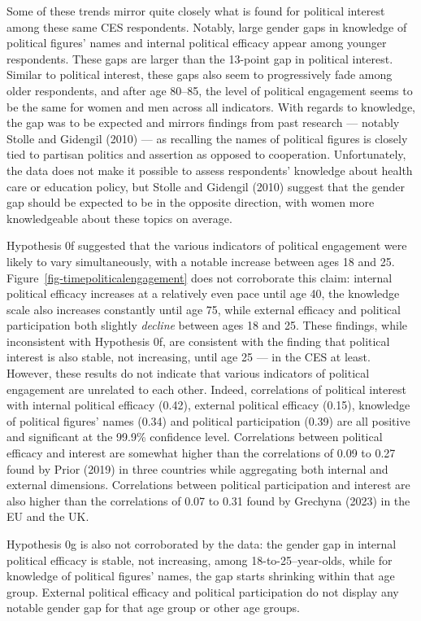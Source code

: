 \documentclass[
  letterpaper,
  DIV=11,
  numbers=noendperiod]{scrreprt}
\begin{document}
Some of these trends mirror quite closely what is found for political
interest among these same CES respondents. Notably, large gender gaps in
knowledge of political figures' names and internal political efficacy
appear among younger respondents. These gaps are larger than the
13-point gap in political interest. Similar to political interest, these
gaps also seem to progressively fade among older respondents, and after
age 80--85, the level of political engagement seems to be the same for
women and men across all indicators. With regards to knowledge, the gap
was to be expected and mirrors findings from past research --- notably
Stolle and Gidengil (2010) --- as recalling the names of political
figures is closely tied to partisan politics and assertion as opposed to
cooperation. Unfortunately, the data does not make it possible to assess
respondents' knowledge about health care or education policy, but Stolle
and Gidengil (2010) suggest that the gender gap should be expected to be
in the opposite direction, with women more knowledgeable about these
topics on average.

Hypothesis 0f suggested that the various indicators of political
engagement were likely to vary simultaneously, with a notable increase
between ages 18 and 25. Figure~\ref{fig-timepoliticalengagement} does
not corroborate this claim: internal political efficacy increases at a
relatively even pace until age 40, the knowledge scale also increases
constantly until age 75, while external efficacy and political
participation both slightly \emph{decline} between ages 18 and 25. These
findings, while inconsistent with Hypothesis 0f, are consistent with the
finding that political interest is also stable, not increasing, until
age 25 --- in the CES at least. However, these results do not indicate
that various indicators of political engagement are unrelated to each
other. Indeed, correlations of political interest with internal
political efficacy (0.42), external political efficacy (0.15), knowledge
of political figures' names (0.34) and political participation (0.39)
are all positive and significant at the 99.9\% confidence level.
Correlations between political efficacy and interest are somewhat higher
than the correlations of 0.09 to 0.27 found by Prior (2019) in three
countries while aggregating both internal and external dimensions.
Correlations between political participation and interest are also
higher than the correlations of 0.07 to 0.31 found by Grechyna (2023) in
the EU and the UK.

Hypothesis 0g is also not corroborated by the data: the gender gap in
internal political efficacy is stable, not increasing, among
18-to-25--year-olds, while for knowledge of political figures' names,
the gap starts shrinking within that age group. External political
efficacy and political participation do not display any notable gender
gap for that age group or other age groups.
\end{document}
